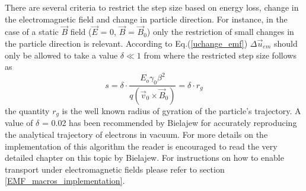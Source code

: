 There are several criteria to restrict the step size based on energy loss, change in the electromagnetic field and change in particle direction. For instance, in the case of a static $\vec{B}$ field ($\vec{E}$ = 0, $\vec{B}$ = $\vec{B}_0$) only the restriction of small changes in the particle direction is relevant. According to Eq.(\ref{uchange_emf}) $\Delta\vec{u}_{em}$ should only be allowed to take a value $\delta \ll 1$ from where the restricted step size follows as
\begin{equation}
\label{uchange_restriction}
  s = \delta \cdot \frac{E_o \gamma_0 \beta^2}{q\left(\vec{v}_0 \times \vec{B}_0\right)} = \delta \cdot r_g
\end{equation}
the quantity $r_g$ is the well known radius of gyration of the particle's trajectory. A value of $\delta$ = 0.02 has been recommended by Bielajew for accurately reproducing the analytical trajectory of electrons in vacuum. For more details on the implementation of this algorithm the reader is encouraged to read the very detailed chapter on this topic by Bielajew\cite{Bi89a}. For instructions on how to enable transport under electromagnetic fields please refer to section \ref{EMF_macros_implementation}.

\newpage
